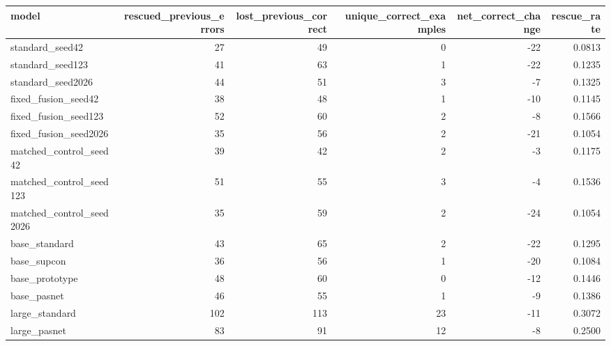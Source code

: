 \begin{tabular}{lrrrrr}
\toprule
model & rescued\_previous\_errors & lost\_previous\_correct & unique\_correct\_examples & net\_correct\_change & rescue\_rate \\
\midrule
standard\_seed42 & 27 & 49 & 0 & -22 & 0.0813 \\
standard\_seed123 & 41 & 63 & 1 & -22 & 0.1235 \\
standard\_seed2026 & 44 & 51 & 3 & -7 & 0.1325 \\
fixed\_fusion\_seed42 & 38 & 48 & 1 & -10 & 0.1145 \\
fixed\_fusion\_seed123 & 52 & 60 & 2 & -8 & 0.1566 \\
fixed\_fusion\_seed2026 & 35 & 56 & 2 & -21 & 0.1054 \\
matched\_control\_seed42 & 39 & 42 & 2 & -3 & 0.1175 \\
matched\_control\_seed123 & 51 & 55 & 3 & -4 & 0.1536 \\
matched\_control\_seed2026 & 35 & 59 & 2 & -24 & 0.1054 \\
base\_standard & 43 & 65 & 2 & -22 & 0.1295 \\
base\_supcon & 36 & 56 & 1 & -20 & 0.1084 \\
base\_prototype & 48 & 60 & 0 & -12 & 0.1446 \\
base\_pasnet & 46 & 55 & 1 & -9 & 0.1386 \\
large\_standard & 102 & 113 & 23 & -11 & 0.3072 \\
large\_pasnet & 83 & 91 & 12 & -8 & 0.2500 \\
\bottomrule
\end{tabular}
